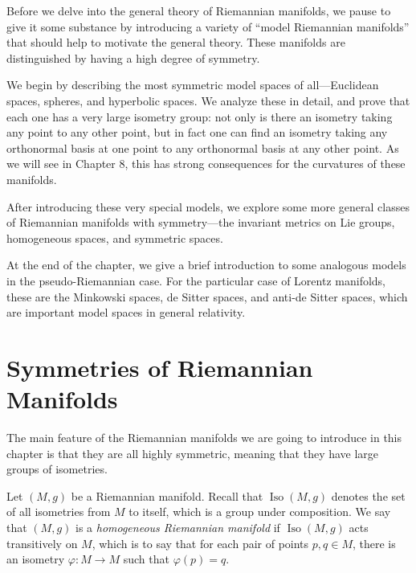 
Before we delve into the general theory of Riemannian manifolds, we pause to give it some substance by introducing a variety of ``model Riemannian manifolds'' that should help to motivate the general theory. These manifolds are distinguished by having a high degree of symmetry.

We begin by describing the most symmetric model spaces of all---Euclidean spaces, spheres, and hyperbolic spaces. We analyze these in detail, and prove that each one has a very large isometry group: not only is there an isometry taking any point to any other point, but in fact one can find an isometry taking any orthonormal basis at one point to any orthonormal basis at any other point. As we will see in Chapter 8, this has strong consequences for the curvatures of these manifolds.

After introducing these very special models, we explore some more general classes of Riemannian manifolds with symmetry---the invariant metrics on Lie groups, homogeneous spaces, and symmetric spaces.

At the end of the chapter, we give a brief introduction to some analogous models in the pseudo-Riemannian case. For the particular case of Lorentz manifolds, these are the Minkowski spaces, de Sitter spaces, and anti-de Sitter spaces, which are important model spaces in general relativity.

\section{Symmetries of Riemannian Manifolds}

The main feature of the Riemannian manifolds we are going to introduce in this chapter is that they are all highly symmetric, meaning that they have large groups of isometries.

Let $(M,g)$ be a Riemannian manifold. Recall that $\operatorname{Iso}(M,g)$ denotes the set of all isometries from $M$ to itself, which is a group under composition. We say that $(M,g)$ is a \emph{homogeneous Riemannian manifold} if $\operatorname{Iso}(M,g)$ acts transitively on $M$, which is to say that for each pair of points $p,q\in M$, there is an isometry $\varphi\colon M\to M$ such that $\varphi(p)=q$.

